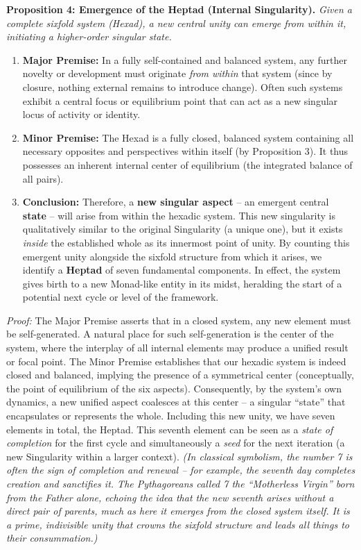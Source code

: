 \documentclass[11pt]{article}
\theoremstyle{plain}
\begin{document}
\textbf{Proposition 4: Emergence of the Heptad (Internal Singularity).} \textit{Given a complete sixfold system (Hexad), a new central unity can emerge from within it, initiating a higher-order singular state.}

\begin{enumerate}
    \item \textbf{Major Premise:} In a fully self-contained and balanced system, any further novelty or development must originate \textit{from within} that system (since by closure, nothing external remains to introduce change). Often such systems exhibit a central focus or equilibrium point that can act as a new singular locus of activity or identity.
    \item \textbf{Minor Premise:} The Hexad is a fully closed, balanced system containing all necessary opposites and perspectives within itself (by Proposition 3). It thus possesses an inherent internal center of equilibrium (the integrated balance of all pairs).
    \item \textbf{Conclusion:} Therefore, a \textbf{new singular aspect} – an emergent central \textbf{state} – will arise from within the hexadic system. This new singularity is qualitatively similar to the original Singularity (a unique one), but it exists \textit{inside} the established whole as its innermost point of unity. By counting this emergent unity alongside the sixfold structure from which it arises, we identify a \textbf{Heptad} of seven fundamental components. In effect, the system gives birth to a new Monad-like entity in its midst, heralding the start of a potential next cycle or level of the framework.
\end{enumerate}
\textit{Proof:} The Major Premise asserts that in a closed system, any new element must be self-generated. A natural place for such self-generation is the center of the system, where the interplay of all internal elements may produce a unified result or focal point. The Minor Premise establishes that our hexadic system is indeed closed and balanced, implying the presence of a symmetrical center (conceptually, the point of equilibrium of the six aspects). Consequently, by the system’s own dynamics, a new unified aspect coalesces at this center – a singular “state” that encapsulates or represents the whole. Including this new unity, we have seven elements in total, the Heptad. This seventh element can be seen as a \textit{state of completion} for the first cycle and simultaneously a \textit{seed} for the next iteration (a new Singularity within a larger context). \textit{(In classical symbolism, the number 7 is often the sign of completion and renewal – for example, the seventh day completes creation and sanctifies it. The Pythagoreans called 7 the “Motherless Virgin” born from the Father alone, echoing the idea that the new seventh arises without a direct pair of parents, much as here it emerges from the closed system itself. It is a prime, indivisible unity that crowns the sixfold structure and leads all things to their consummation.)}
\end{document}
